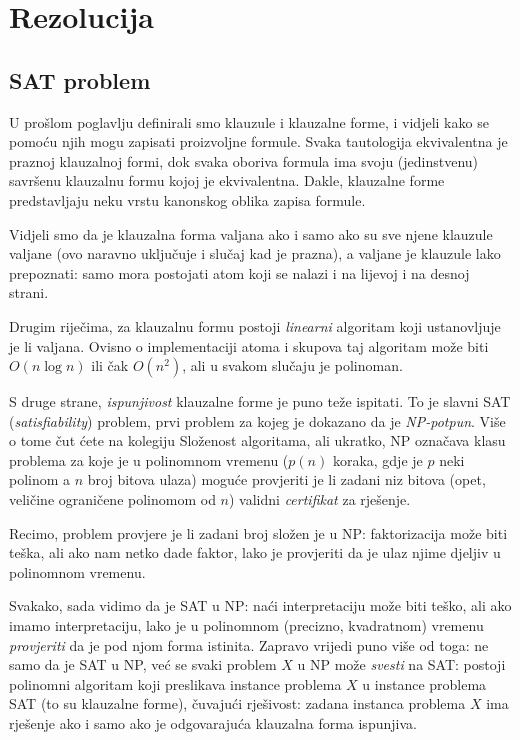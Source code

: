 \chapter{Rezolucija}

\section{SAT problem}

U prošlom poglavlju definirali smo klauzule i klauzalne forme, i vidjeli kako se pomoću njih mogu zapisati proizvoljne formule. Svaka tautologija ekvivalentna je praznoj klauzalnoj formi, dok svaka oboriva formula ima svoju (jedinstvenu) savršenu klauzalnu formu kojoj je ekvivalentna. Dakle, klauzalne forme predstavljaju neku vrstu kanonskog oblika zapisa formule.

Vidjeli smo da je klauzalna forma valjana ako i samo ako su sve njene klauzule valjane (ovo naravno uključuje i slučaj kad je prazna), a valjane je klauzule lako prepoznati: samo mora postojati atom koji se nalazi i na lijevoj i na desnoj strani.

Drugim riječima, za klauzalnu formu postoji \emph{linearni} algoritam koji ustanovljuje je li valjana. Ovisno o implementaciji atoma i skupova taj algoritam može biti $O(n\log n)$ ili čak $O(n^2)$, ali u svakom slučaju je polinoman.

S druge strane, \emph{ispunjivost} klauzalne forme je puno teže ispitati. To je slavni SAT (\emph{satisfiability}) problem, prvi problem za kojeg je dokazano da je \emph{NP-potpun}. Više o tome čut ćete na kolegiju Složenost algoritama, ali ukratko, NP označava klasu problema za koje je u polinomnom vremenu ($p(n)$ koraka, gdje je $p$ neki polinom a $n$ broj bitova ulaza) moguće provjeriti je li zadani niz bitova (opet, veličine ograničene polinomom od $n$) validni \emph{certifikat} za rješenje.

Recimo, problem provjere je li zadani broj složen je u NP: faktorizacija može biti teška, ali ako nam netko dade faktor, lako je provjeriti da je ulaz njime djeljiv u polinomnom vremenu.

Svakako, sada vidimo da je SAT u NP: naći interpretaciju može biti teško, ali ako imamo interpretaciju, lako je u polinomnom  (precizno, kvadratnom) vremenu \emph{provjeriti} da je pod njom forma istinita. Zapravo vrijedi puno više od toga: ne samo da je SAT u NP, već se svaki problem $X$ u NP može \emph{svesti} na SAT: postoji polinomni algoritam koji preslikava instance problema $X$ u instance problema SAT (to su klauzalne forme), čuvajući rješivost: zadana instanca problema $X$ ima rješenje ako i samo ako je odgovarajuća klauzalna forma ispunjiva.

